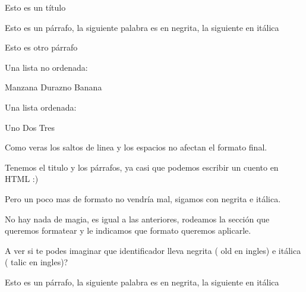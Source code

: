 \documentclass[letterpaper,10pt,spanish]{sphinxmanual}
\begin{document}
%
\begin{sphinxVerbatim}[commandchars=\\\{\}]
Esto es un título

Esto es un párrafo, la siguiente palabra es en negrita, la siguiente en itálica

Esto es otro párrafo

  Una lista no ordenada:

Manzana
Durazno
Banana

Una lista ordenada:

Uno
Dos
Tres
\end{sphinxVerbatim}

Como veras los saltos de linea y los espacios no afectan el formato final.

\begin{figure}[htbp]
\centering

\noindent{}
\end{figure}

Tenemos el titulo y los párrafos, ya casi que podemos escribir un cuento en HTML :)

Pero un poco mas de formato no vendría mal, sigamos con negrita e itálica.

No hay nada de magia, es igual a las anteriores, rodeamos la sección que queremos
formatear y le indicamos que formato queremos aplicarle.

A ver si te podes imaginar que identificador lleva negrita ( old en ingles)
e itálica ( talic en ingles)?

%
\begin{sphinxVerbatim}[commandchars=\\\{\}]
Esto es un párrafo, la siguiente palabra es en negrita, la siguiente en itálica
\end{sphinxVerbatim}
\end{document}
